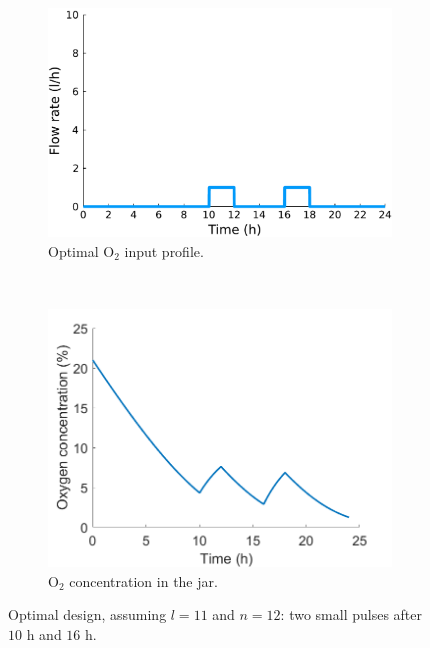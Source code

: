 \begin{figure}
	\centering
	\begin{subfigure}[b]{0.45\textwidth}
		\includegraphics[width=\textwidth]{figure/paper 1/extra7}
		\caption{Optimal $\text{O}_2$ input profile.}
		\label{input3}
	\end{subfigure}
	~ %
	\begin{subfigure}[b]{0.45\textwidth}
		\includegraphics[width=\textwidth]{figure/paper 1/design3.png}
		\caption{$\text{O}_2$ concentration in the jar.}
		\label{output3}
	\end{subfigure}
	\caption{Optimal design, assuming $l = 11$ and $n = 12$: two small pulses after $10 \text{ h}$ and $16 \text{ h}$.}
	\label{figODE3}
\end{figure}
